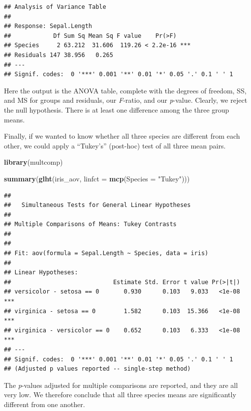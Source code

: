 \documentclass[]{book}
\newenvironment{Shaded}{\begin{snugshade}}{\end{snugshade}}
\newcommand{\DataTypeTok}[1]{\textcolor[rgb]{0.13,0.29,0.53}{#1}}
\newcommand{\KeywordTok}[1]{\textcolor[rgb]{0.13,0.29,0.53}{\textbf{#1}}}
\newcommand{\NormalTok}[1]{#1}
\newcommand{\StringTok}[1]{\textcolor[rgb]{0.31,0.60,0.02}{#1}}
\begin{document}
\begin{verbatim}
## Analysis of Variance Table
## 
## Response: Sepal.Length
##            Df Sum Sq Mean Sq F value    Pr(>F)    
## Species     2 63.212  31.606  119.26 < 2.2e-16 ***
## Residuals 147 38.956   0.265                      
## ---
## Signif. codes:  0 '***' 0.001 '**' 0.01 '*' 0.05 '.' 0.1 ' ' 1
\end{verbatim}

Here the output is the ANOVA table, complete with the degrees of freedom, SS, and MS for groups and residuals, our \emph{F}-ratio, and our \emph{p}-value. Clearly, we reject the null hypothesis. There is at least one difference among the three group means.

Finally, if we wanted to know whether all three species are different from each other, we could apply a ``Tukey's'' (post-hoc) test of all three mean pairs.

\begin{Shaded}
\begin{Highlighting}[]
\KeywordTok{library}\NormalTok{(multcomp)}
\end{Highlighting}
\end{Shaded}

\begin{Shaded}
\begin{Highlighting}[]
\KeywordTok{summary}\NormalTok{(}\KeywordTok{glht}\NormalTok{(iris_aov, }\DataTypeTok{linfct =} \KeywordTok{mcp}\NormalTok{(}\DataTypeTok{Species =} \StringTok{"Tukey"}\NormalTok{)))}
\end{Highlighting}
\end{Shaded}

\begin{verbatim}
## 
##   Simultaneous Tests for General Linear Hypotheses
## 
## Multiple Comparisons of Means: Tukey Contrasts
## 
## 
## Fit: aov(formula = Sepal.Length ~ Species, data = iris)
## 
## Linear Hypotheses:
##                             Estimate Std. Error t value Pr(>|t|)    
## versicolor - setosa == 0       0.930      0.103   9.033   <1e-08 ***
## virginica - setosa == 0        1.582      0.103  15.366   <1e-08 ***
## virginica - versicolor == 0    0.652      0.103   6.333   <1e-08 ***
## ---
## Signif. codes:  0 '***' 0.001 '**' 0.01 '*' 0.05 '.' 0.1 ' ' 1
## (Adjusted p values reported -- single-step method)
\end{verbatim}

The \emph{p}-values adjusted for multiple comparisons are reported, and they are all very low. We therefore conclude that all three species means are significantly different from one another.
\end{document}
